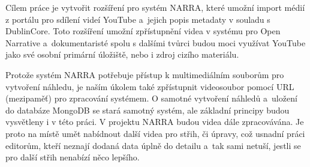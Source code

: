 \par Cílem práce je vytvořit rozšíření pro systém NARRA, které umožní import médií z portálu pro sdílení videí YouTube a~jejich popis metadaty v souladu s DublinCore. Toto rozšíření umožní zpřístupnění videa v systému pro Open Narrative a~dokumentaristé spolu s dalšími tvůrci budou moci využívat YouTube jako své osobní primární úložiště, nebo i zdroj cizího materiálu.
\par Protože systém NARRA potřebuje přístup k multimediálním souborům pro vytvoření náhledu, je naším úkolem také zpřístupnit videosoubor pomocí URL (mezipaměť) pro zpracování systémem. O samotné vytvoření náhledů a~uložení do databáze MongoDB se stará samotný systém, ale základní principy budou vysvětleny i v této práci. V projektu NARRA budou videa dále zpracovávána. Je proto na místě umět nabídnout další videa pro střih, či úpravy, což usnadní práci editorům, kteří neznají dodaná data úplně do detailu a~tak sami netuší, jestli se pro další střih nenabízí něco lepšího.